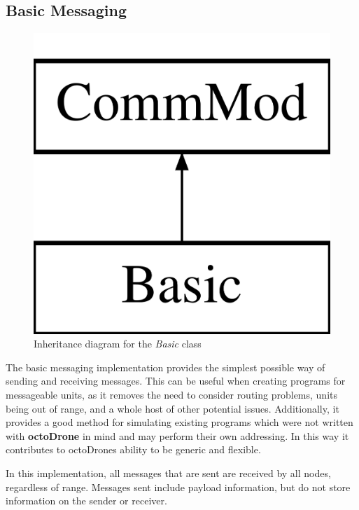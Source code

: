 \subsection{Basic Messaging}
\begin{figure}[H]
\centering
\includegraphics[scale=0.2]{../documentation/latex/class_basic}	
\caption{Inheritance diagram for the \textit{Basic} class}
\end{figure}

The basic messaging implementation provides the simplest possible way of sending and receiving messages. This can be useful when creating programs for messageable units, as it removes the need to consider routing problems, units being out of range, and a whole host of other potential issues. Additionally, it provides a good method for simulating existing programs which were not written with \textbf{octoDrone} in mind and may perform their own addressing. In this way it contributes to octoDrones ability to be generic and flexible. 

In this implementation, all messages that are sent are received by all nodes, regardless of range. Messages sent include payload information, but do not store information on the sender or receiver.
	
